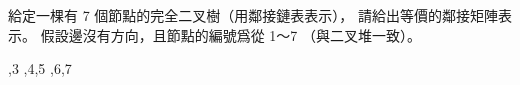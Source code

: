 \startEXERCISE
給定一棵有 7 個節點的完全二叉樹（用鄰接鏈表表示），
請給出等價的鄰接矩陣表示。
假設邊沒有方向，且節點的編號爲從 1～7 （與二叉堆一致）。
\stopEXERCISE

\startANSWER
\startformulas
\startformula\startmathalignment
{} \NC {},3 \NR
{} \NC {},4,5 \NR
{} \NC {},6,7 \NR
{} \NC {} \NR
{} \NC {} \NR
{} \NC {} \NR
{} \NC {} \NR
\stopmathalignment\stopformula

\startformula\startmatrix
{}       \NR
{}       \NR
{}       \NR
{}       \NR
{}       \NR
{}       \NR
{}       \NR
\stopmatrix\stopformula
\stopformulas
\stopANSWER
